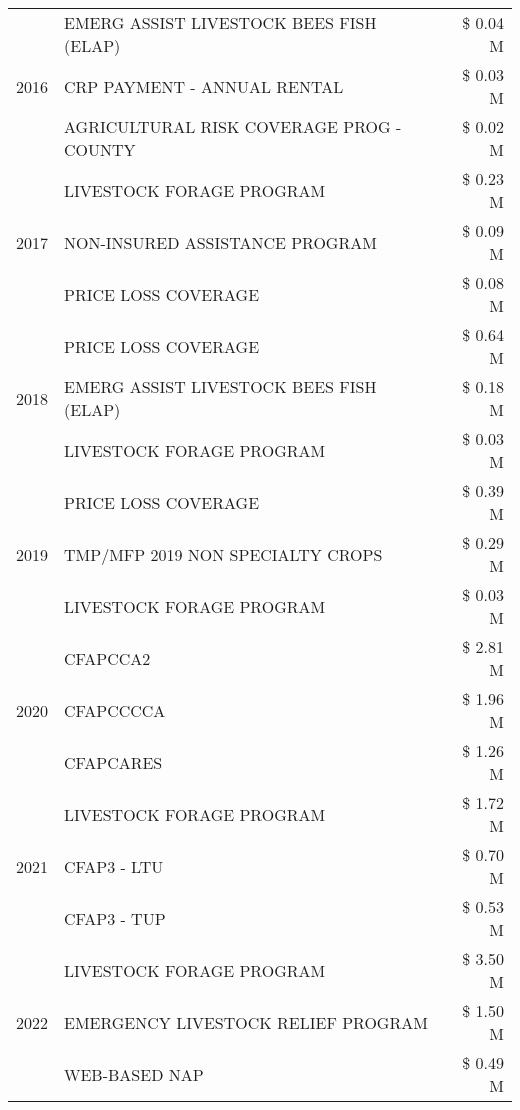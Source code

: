 \begin{tabular}{llr}
\cline{1-3}
\multirow[t]{3}{*}{2016} & EMERG ASSIST LIVESTOCK BEES FISH (ELAP) & \$ 0.04 M \\
 & CRP PAYMENT - ANNUAL RENTAL & \$ 0.03 M \\
 & AGRICULTURAL RISK COVERAGE PROG - COUNTY & \$ 0.02 M \\
\cline{1-3}
\multirow[t]{3}{*}{2017} & LIVESTOCK FORAGE PROGRAM & \$ 0.23 M \\
 & NON-INSURED ASSISTANCE PROGRAM & \$ 0.09 M \\
 & PRICE LOSS COVERAGE & \$ 0.08 M \\
\cline{1-3}
\multirow[t]{3}{*}{2018} & PRICE LOSS COVERAGE & \$ 0.64 M \\
 & EMERG ASSIST LIVESTOCK BEES FISH (ELAP) & \$ 0.18 M \\
 & LIVESTOCK FORAGE PROGRAM & \$ 0.03 M \\
\cline{1-3}
\multirow[t]{3}{*}{2019} & PRICE LOSS COVERAGE & \$ 0.39 M \\
 & TMP/MFP 2019 NON SPECIALTY CROPS & \$ 0.29 M \\
 & LIVESTOCK FORAGE PROGRAM & \$ 0.03 M \\
\cline{1-3}
\multirow[t]{3}{*}{2020} & CFAPCCA2 & \$ 2.81 M \\
 & CFAPCCCCA & \$ 1.96 M \\
 & CFAPCARES & \$ 1.26 M \\
\cline{1-3}
\multirow[t]{3}{*}{2021} & LIVESTOCK FORAGE PROGRAM & \$ 1.72 M \\
 & CFAP3 - LTU & \$ 0.70 M \\
 & CFAP3 - TUP & \$ 0.53 M \\
\cline{1-3}
\multirow[t]{3}{*}{2022} & LIVESTOCK FORAGE PROGRAM & \$ 3.50 M \\
 & EMERGENCY LIVESTOCK RELIEF PROGRAM & \$ 1.50 M \\
 & WEB-BASED NAP & \$ 0.49 M \\
\cline{1-3}
\bottomrule
\end{tabular}
